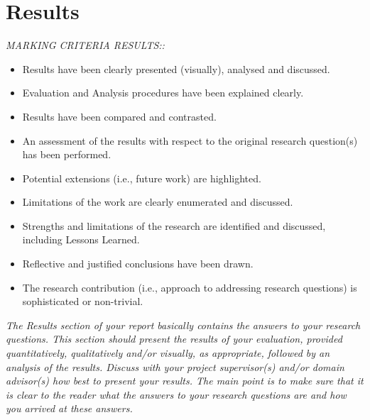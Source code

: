 \section{Results} 
\emph{MARKING CRITERIA RESULTS::}
\begin{itemize}
\item Results have been clearly presented (visually), analysed and discussed.
\item Evaluation and Analysis procedures have been explained clearly.
\item Results have been compared and contrasted.
\item An assessment of the results with respect to the original research question(s) has been performed.
\item Potential extensions (i.e., future work) are highlighted.
\item Limitations of the work are clearly enumerated and discussed.
\item Strengths and limitations of the research are identified and discussed, including Lessons Learned.
\item Reflective and justified conclusions have been drawn.
\item The research contribution (i.e., approach to addressing research questions) is sophisticated or non-trivial.
\end{itemize}
\emph{The Results section of your report basically contains the answers to your research questions. This section should present the results of your evaluation, provided quantitatively, qualitatively and/or visually, as appropriate, followed by an analysis of the results. Discuss with your project supervisor(s) and/or domain advisor(s) how best to present your results. The main point is to make sure that it is clear to the reader what the answers to your research questions are and how you arrived at these answers.}
